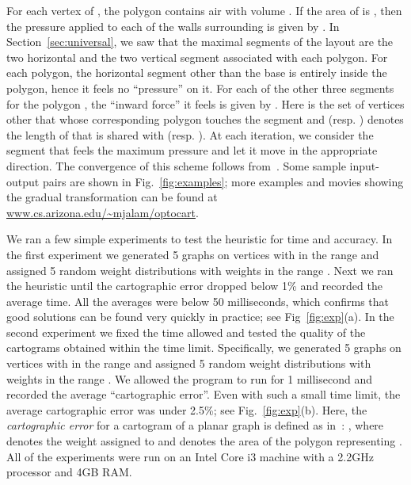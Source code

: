 \documentclass[11pt]{article}
\begin{document}
For each vertex  of , the polygon  contains air with volume . If the area
 of  is , then the pressure applied to each of the walls surrounding  is given by
 . In Section~\ref{sec:universal}, we saw that the maximal segments of the layout
 are the two horizontal and the two vertical segment associated with each polygon. For each polygon,
 the horizontal segment other than the base is entirely inside the polygon, hence it feels no
 ``pressure'' on it. For each of the other three segments  for the polygon , the ``inward force''
 it feels is given by .
 Here  is the set of vertices other that  whose corresponding polygon touches the segment 
 and  (resp. ) denotes the length of  that is shared with  (resp. ).
At each iteration,
 we consider the segment that feels the maximum pressure and let it move in the appropriate direction. The convergence of this scheme
 follows from~\cite{ITK98}. Some sample input-output pairs are shown in Fig.~\ref{fig:examples}; more examples and movies showing the gradual transformation can be found at \url{www.cs.arizona.edu/~mjalam/optocart}.



We ran a few simple experiments to test the heuristic for time and accuracy. In the first experiment we generated 5 graphs on  vertices with  in the range  and assigned 5 random weight distributions with weights in the range . Next we ran the heuristic until the cartographic error dropped below 1\% and recorded the average time. All the averages were below 50 milliseconds, which confirms that good solutions can be found very quickly in practice; see Fig~\ref{fig:exp}(a).
In the second experiment we fixed the time allowed and tested the quality of the cartograms obtained within the time limit. Specifically, we generated 5 graphs on  vertices with  in the range 
and assigned 5 random weight distributions with weights in the range . We allowed the program to run for 1 millisecond and recorded the average ``cartographic error''. Even with such a small time limit, the average cartographic error was under 2.5\%; see Fig.~\ref{fig:exp}(b). Here, the \textit{cartographic error} for a cartogram of a planar graph  is defined as in~\cite{ks07}: , where  denotes the weight assigned to  and  denotes the area of the polygon representing . All of the experiments were run on an Intel Core i3 machine with a 2.2GHz processor and 4GB RAM.
\end{document}
